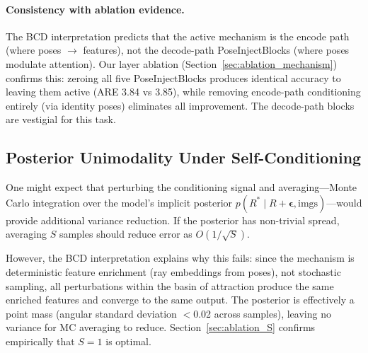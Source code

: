 \paragraph{Consistency with ablation evidence.} The BCD interpretation predicts that the active mechanism is the encode path (where poses $\rightarrow$ features), not the decode-path PoseInjectBlocks (where poses modulate attention). Our layer ablation (Section~\ref{sec:ablation_mechanism}) confirms this: zeroing all five PoseInjectBlocks produces identical accuracy to leaving them active (ARE 3.84\degree{} vs 3.85\degree{}), while removing encode-path conditioning entirely (via identity poses) eliminates all improvement. The decode-path blocks are vestigial for this task.

\subsection{Posterior Unimodality Under Self-Conditioning}

One might expect that perturbing the conditioning signal and averaging---Monte Carlo integration over the model's implicit posterior $p(R^* \mid R + \boldsymbol{\epsilon}, \text{imgs})$---would provide additional variance reduction. If the posterior has non-trivial spread, averaging $S$ samples should reduce error as $O(1/\sqrt{S})$.

However, the BCD interpretation explains why this fails: since the mechanism is deterministic feature enrichment (ray embeddings from poses), not stochastic sampling, all perturbations within the basin of attraction produce the same enriched features and converge to the same output. The posterior is effectively a point mass (angular standard deviation $<$0.02\degree{} across samples), leaving no variance for MC averaging to reduce. Section~\ref{sec:ablation_S} confirms empirically that $S=1$ is optimal.
